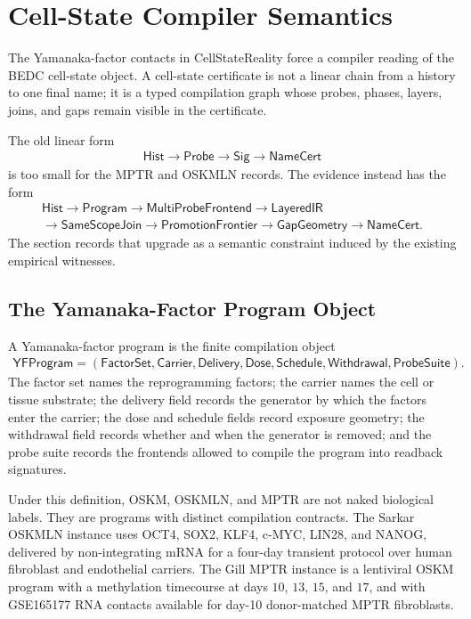 \section{Cell-State Compiler Semantics}
\label{sec:cellstate-compiler-semantics}

The Yamanaka-factor contacts in CellStateReality force a compiler reading of the BEDC cell-state object. A cell-state certificate is not a linear chain from a history to one final name; it is a typed compilation graph whose probes, phases, layers, joins, and gaps remain visible in the certificate.

The old linear form
$$
\begin{aligned}
\mathsf{Hist}\to\mathsf{Probe}\to\mathsf{Sig}\to\mathsf{NameCert}
\end{aligned}
$$
is too small for the MPTR and OSKMLN records. The evidence instead has the form
$$
\begin{aligned}
\mathsf{Hist}\to\mathsf{Program}\to\mathsf{MultiProbeFrontend}\to\mathsf{LayeredIR}\\
\to
\mathsf{SameScopeJoin}\to\mathsf{PromotionFrontier}\to\mathsf{GapGeometry}\to\mathsf{NameCert}.
\end{aligned}
$$
The section records that upgrade as a semantic constraint induced by the existing empirical witnesses.

\subsection{The Yamanaka-Factor Program Object}

\begin{definition}
\label{def:yamanaka-factor-program}
A Yamanaka-factor program is the finite compilation object
$$
\begin{aligned}
\mathsf{YFProgram}=
(\mathsf{FactorSet},\mathsf{Carrier},\mathsf{Delivery},\mathsf{Dose},\mathsf{Schedule},
\mathsf{Withdrawal},\mathsf{ProbeSuite}).
\end{aligned}
$$
The factor set names the reprogramming factors; the carrier names the cell or tissue substrate; the delivery field records the generator by which the factors enter the carrier; the dose and schedule fields record exposure geometry; the withdrawal field records whether and when the generator is removed; and the probe suite records the frontends allowed to compile the program into readback signatures.
\end{definition}

Under this definition, OSKM, OSKMLN, and MPTR are not naked biological labels. They are programs with distinct compilation contracts. The Sarkar OSKMLN instance uses OCT4, SOX2, KLF4, c-MYC, LIN28, and NANOG, delivered by non-integrating mRNA for a four-day transient protocol over human fibroblast and endothelial carriers. The Gill MPTR instance is a lentiviral OSKM program with a methylation timecourse at days $10$, $13$, $15$, and $17$, and with GSE165177 RNA contacts available for day-10 donor-matched MPTR fibroblasts.

